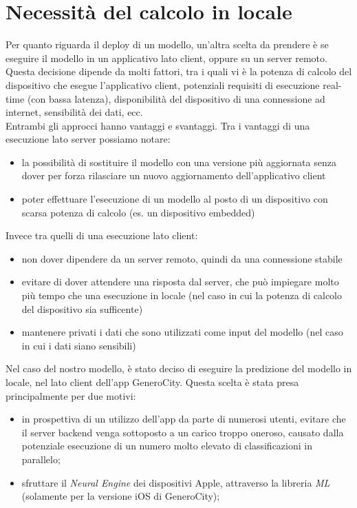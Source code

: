 \section{Necessità del calcolo in locale}

Per quanto riguarda il deploy di un modello, un'altra scelta da prendere è se 
eseguire il modello in un applicativo lato client, oppure su un server remoto.
Questa decisione dipende da molti fattori, tra i quali vi è la potenza di calcolo
del dispositivo che esegue l'applicativo client, potenziali requisiti di esecuzione
real-time (con bassa latenza), disponibilità del dispositivo di una connessione 
ad internet, sensibilità dei dati, ecc.\\
Entrambi gli approcci hanno vantaggi e svantaggi. Tra i vantaggi di una
 esecuzione lato server possiamo notare: 
\begin{itemize}
    \item la possibilità di sostituire il modello con una versione più aggiornata
    senza dover per forza rilasciare un nuovo aggiornamento dell'applicativo client
    \item poter effettuare l'esecuzione di un modello al posto di un dispositivo
   	con scarsa potenza di calcolo (es. un dispositivo embedded)
\end{itemize}
Invece tra quelli di una esecuzione lato client:
\begin{itemize}
    \item non dover dipendere da un server remoto, quindi da una connessione 
    stabile 
    \item evitare di dover attendere una risposta dal server, che può impiegare
    molto più tempo che una esecuzione in locale (nel caso in cui la potenza di
    calcolo del dispositivo sia sufficente)
    \item mantenere privati i dati che sono utilizzati come input del modello
    (nel caso in cui i dati siano sensibili)
\end{itemize}
Nel caso del nostro modello, è stato deciso di eseguire la predizione del modello
in locale, nel lato client dell'app GeneroCity. Questa scelta è stata presa 
principalmente per due motivi:
\begin{itemize}
    \item in prospettiva di un utilizzo dell'app da parte di numerosi utenti,
    evitare che il server backend venga sottoposto a un carico troppo oneroso,
    causato dalla potenziale esecuzione di un numero molto elevato di 
    classificazioni in parallelo;
    \item sfruttare il \emph{Neural Engine} dei dispositivi Apple, attraverso la 
    libreria \emph{ ML} (solamente per la versione iOS di GeneroCity);
\end{itemize}

